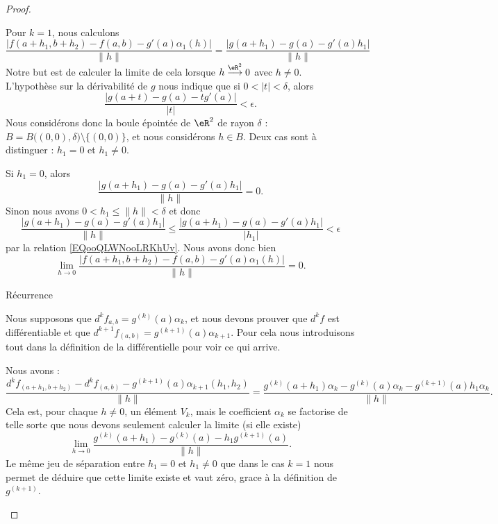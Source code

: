 \begin{proof}
\begin{subproof}
    Pour \( k=1\), nous calculons
    \begin{equation}
        \frac{ |f(a+h_1,b+h_2)-f(a,b)-g'(a)\alpha_1(h)| }{ \| h \| }=\frac{ |g(a+h_1)-g(a)-g'(a)h_1| }{ \| h \| }
    \end{equation}
    Notre but est de calculer la limite de cela lorsque \( h\stackrel{\eR^2}{\longrightarrow}0\) avec \( h\neq 0\). L'hypothèse sur la dérivabilité de \( g\) nous indique que si \( 0<| t |<\delta\), alors
    \begin{equation}        \label{EQooQLWNooLRKhUv}
        \frac{ | g(a+t)-g(a)-tg'(a) | }{ | t | }<\epsilon.
    \end{equation}
    Nous considérons donc la boule épointée de \( \eR^2\) de rayon \( \delta\) : \( B=B\big( (0,0),\delta \big)\setminus\{(0,0)\}\), et nous considérons \( h\in B\). Deux cas sont à distinguer : \( h_1=0\) et \( h_1\neq 0\). 

    Si \( h_1=0\), alors
    \begin{equation}
        \frac{ |g(a+h_1)-g(a)-g'(a)h_1| }{ \| h \| }=0.
    \end{equation}
    Sinon nous avons \( 0<h_1\leq\| h \|<\delta\) et donc
    \begin{equation}
        \frac{ |g(a+h_1)-g(a)-g'(a)h_1| }{ \| h \| }\leq\frac{ |g(a+h_1)-g(a)-g'(a)h_1| }{ | h_1 | }<\epsilon
    \end{equation}
    par la relation \eqref{EQooQLWNooLRKhUv}. Nous avons donc bien
    \begin{equation}
        \lim_{h\to 0}\frac{ |f(a+h_1,b+h_2)-f(a,b)-g'(a)\alpha_1(h)| }{ \| h \| }=0.
    \end{equation}

\item[Récurrence]

    Nous supposons que \( d^kf_{a,b}=g^{(k)}(a)\alpha_k\), et nous devons prouver que \( d^kf\) est différentiable et que \( d^{k+1}f_{(a,b)}=g^{(k+1)}(a)\alpha_{k+1}\). Pour cela nous introduisons tout dans la définition de la différentielle pour voir ce qui arrive.

    Nous avons :
    \begin{equation}
        \frac{ d^kf_{(a+h_1,b+h_2)}-d^kf_{(a,b)}-g^{(k+1)}(a)\alpha_{k+1}(h_1,h_2) }{ \| h \| }=
        \frac{ g^{(k)}(a+h_1)\alpha_k-g^{(k)}(a)\alpha_k-g^{(k+1)}(a)h_1\alpha_k }{ \| h \| }.
    \end{equation}
    Cela est, pour chaque \( h\neq 0\), un élément \( V_k\), mais le coefficient \( \alpha_k\) se factorise de telle sorte que nous devons seulement calculer la limite (si elle existe)
    \begin{equation}
        \lim_{h\to 0} \frac{ g^{(k)}(a+h_1)-g^{(k)}(a)-h_1g^{(k+1)}(a) }{ \| h \| }.
    \end{equation}
    Le même jeu de séparation entre \( h_1=0\) et \( h_1\neq 0\) que dans le cas \( k=1\) nous permet de déduire que cette limite existe et vaut zéro, grace à la définition de \( g^{(k+1)}\).
    \end{subproof}


\end{proof}
